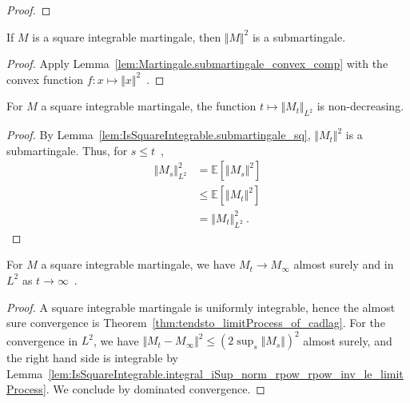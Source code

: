 \begin{proof}
\end{proof}


\begin{lemma}\label{lem:IsSquareIntegrable.submartingale_sq}
  \leanok
If $M$ is a square integrable martingale, then $\Vert M \Vert^2$ is a submartingale.
\end{lemma}

\begin{proof}
  \leanok
Apply Lemma~\ref{lem:Martingale.submartingale_convex_comp} with the convex function $f: x \mapsto \Vert x \Vert^2$~.
\end{proof}


\begin{lemma}\label{lem:IsSquareIntegrable.eLpNorm_two_mono}
  \leanok
For $M$ a square integrable martingale, the function $t \mapsto \Vert M_t \Vert_{L^2}$ is non-decreasing.
\end{lemma}

\begin{proof}
  \leanok
By Lemma~\ref{lem:IsSquareIntegrable.submartingale_sq}, $\Vert M_t \Vert^2$ is a submartingale.
Thus, for $s \le t$~,
\begin{align*}
  \Vert M_s \Vert_{L^2}^2
  &= \mathbb{E}[\Vert M_s \Vert^2]
  \\
  &\le \mathbb{E}[\Vert M_t \Vert^2]
  \\
  &= \Vert M_t \Vert_{L^2}^2
  \: .
\end{align*}
\end{proof}


\begin{lemma}\label{lem:IsSquareIntegrable.tendsto_limitProcess}
  \leanok
For $M$ a square integrable martingale, we have $M_t \to M_\infty$ almost surely and in $L^2$ as $t \to \infty$~.
\end{lemma}

\begin{proof}
  \leanok
A square integrable martingale is uniformly integrable, hence the almost sure convergence is Theorem~\ref{thm:tendsto_limitProcess_of_cadlag}.
For the convergence in $L^2$, we have $\Vert M_t - M_\infty \Vert^2 \le (2 \sup_s \Vert M_s \Vert)^2$ almost surely, and the right hand side is integrable by Lemma~\ref{lem:IsSquareIntegrable.integral_iSup_norm_rpow_rpow_inv_le_limitProcess}.
We conclude by dominated convergence.
\end{proof}


